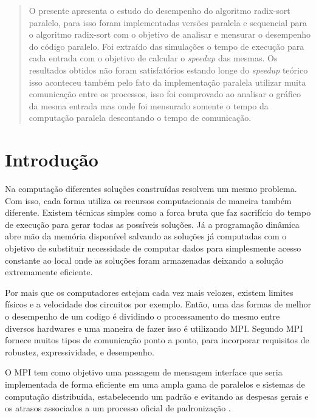 \documentclass[journal]{IEEEtran}
\begin{document}
\renewcommand{\abstractname}{Resumo}

\begin{abstract} 
O presente apresenta o estudo do desempenho do algoritmo radix-sort paralelo, para isso foram implementadas versões paralela e sequencial para o algoritmo radix-sort com o objetivo de analisar e mensurar o desempenho do código paralelo. Foi extraído das simulações o tempo de execução para cada entrada com o objetivo de calcular o \textit{speedup} das mesmas. Os resultados obtidos não foram satisfatórios estando longe do \textit{speedup} teórico isso aconteceu também pelo fato da implementação paralela utilizar muita comunicação entre os processos, isso foi comprovado ao analisar o gráfico da mesma entrada mas onde foi mensurado somente o tempo da computação paralela descontando o tempo de comunicação.
\end{abstract}

\IEEEpeerreviewmaketitle


\section{Introdução}
Na computação diferentes soluções construídas resolvem um mesmo problema. Com isso, cada forma utiliza os recursos computacionais de maneira também diferente. Existem técnicas simples como a forca bruta que faz sacrifício do tempo de execução para gerar todas as possíveis soluções. Já a programação dinâmica abre mão da memória disponível salvando as soluções já computadas com o objetivo de substituir necessidade de computar dados para simplesmente acesso constante ao local onde as soluções foram armazenadas deixando a solução extremamente eficiente.

Por mais que os computadores estejam cada vez mais velozes, existem limites físicos e a velocidade dos circuitos por exemplo. Então, uma das formas de melhor o desempenho de um codigo é dividindo o processamento do mesmo entre diversos hardwares e uma maneira de fazer isso é utilizando MPI. Segundo \cite{barker2015message}  MPI fornece muitos tipos de comunicação ponto a ponto, para incorporar requisitos de robustez, expressividade, e desempenho.


O MPI tem como objetivo uma passagem de mensagem interface que seria implementada de forma eficiente em uma ampla gama de paralelos e
sistemas de computação distribuída, estabelecendo um padrão e evitando as despesas gerais e os atrasos associados a um processo oficial de padronização \cite{barker2015message}. 
\end{document}
